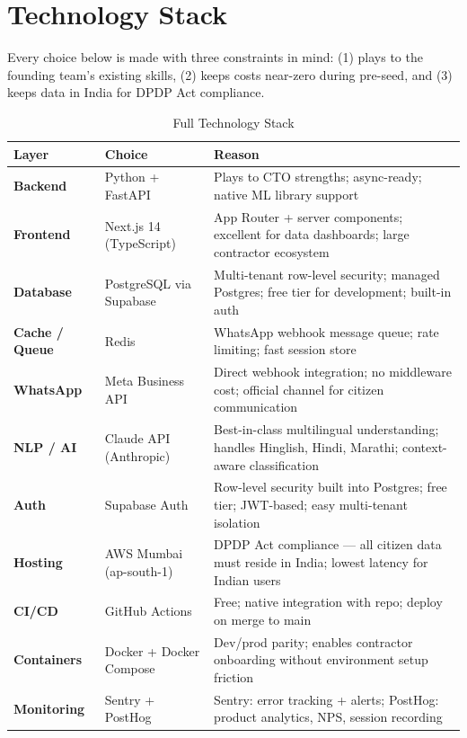 \documentclass[12pt, a4paper]{article}
\begin{document}
\tableofcontents
\newpage

\section{Technology Stack}

Every choice below is made with three constraints in mind: (1) plays to the founding team's existing skills, (2) keeps costs near-zero during pre-seed, and (3) keeps data in India for DPDP Act compliance.

\begin{table}[ht]
\centering
\caption{Full Technology Stack}
\renewcommand{\arraystretch}{1.4}
\begin{tabularx}{\textwidth}{>{\bfseries}p{2.8cm} p{4.2cm} X}
\toprule
\rowcolor{pollitylightblue}
\textbf{Layer} & \textbf{Choice} & \textbf{Reason} \\
\midrule
Backend        & Python + FastAPI         & Plays to CTO strengths; async-ready; native ML library support \\
\midrule
Frontend       & Next.js 14 (TypeScript)  & App Router + server components; excellent for data dashboards; large contractor ecosystem \\
\midrule
Database       & PostgreSQL via Supabase  & Multi-tenant row-level security; managed Postgres; free tier for development; built-in auth \\
\midrule
Cache / Queue  & Redis                    & WhatsApp webhook message queue; rate limiting; fast session store \\
\midrule
WhatsApp       & Meta Business API        & Direct webhook integration; no middleware cost; official channel for citizen communication \\
\midrule
NLP / AI       & Claude API (Anthropic)   & Best-in-class multilingual understanding; handles Hinglish, Hindi, Marathi; context-aware classification \\
\midrule
Auth           & Supabase Auth            & Row-level security built into Postgres; free tier; JWT-based; easy multi-tenant isolation \\
\midrule
Hosting        & AWS Mumbai (ap-south-1)  & DPDP Act compliance --- all citizen data must reside in India; lowest latency for Indian users \\
\midrule
CI/CD          & GitHub Actions           & Free; native integration with repo; deploy on merge to main \\
\midrule
Containers     & Docker + Docker Compose  & Dev/prod parity; enables contractor onboarding without environment setup friction \\
\midrule
Monitoring     & Sentry + PostHog         & Sentry: error tracking + alerts; PostHog: product analytics, NPS, session recording \\
\bottomrule
\end{tabularx}
\end{table}
\end{document}
